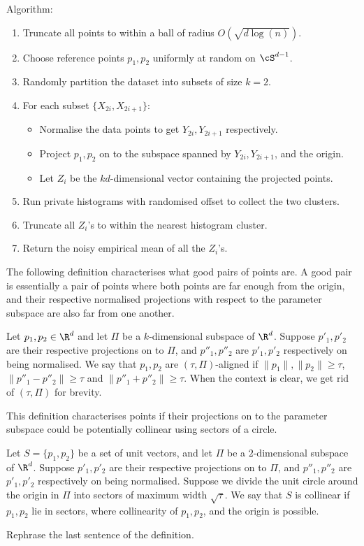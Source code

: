 Algorithm:
\begin{enumerate}
    \item Truncate all points to within a ball of radius
        $O(\sqrt{d\log(n)})$.
    \item Choose reference points $p_1,p_2$ uniformly at
        random on $\cS^{d-1}$.
    \item Randomly partition the dataset into subsets of
        size $k=2$.
    \item For each subset $\{X_{2i},X_{2i+1}\}$:
        \begin{itemize}
            \item Normalise the data points to get
                $Y_{2i},Y_{2i+1}$ respectively.
            \item Project $p_1,p_2$ on to the subspace spanned
                by $Y_{2i},Y_{2i+1}$, and the origin.
            \item Let $Z_i$ be the $kd$-dimensional vector
                containing the projected points.
        \end{itemize}
    \item Run private histograms with randomised offset to collect
        the two clusters.
    \item Truncate all $Z_i$'s to within the nearest histogram
    cluster.
    \item Return the noisy empirical mean of all the $Z_i$'s.
\end{enumerate}

The following definition characterises what good pairs of
points are. A good pair is essentially a pair of points where
both points are far enough from the origin, and their respective
normalised projections with respect to the parameter subspace
are also far from one another.
\begin{definition}
    Let $p_1,p_2 \in \R^d$ and let $\Pi$ be a $k$-dimensional
    subspace of $\R^d$. Suppose $p'_1,p'_2$ are their respective
    projections on to $\Pi$, and $p''_1,p''_2$ are $p'_1,p'_2$
    respectively on being normalised. We say that $p_1,p_2$
    are $(\tau,\Pi)$-aligned if $\|p_1\|,\|p_2\| \geq \tau$,
    $\|p''_1-p''_2\| \geq \tau$ and $\|p''_1+p''_2\| \geq \tau$.
    When the context is clear, we get rid of $(\tau,\Pi)$
    for brevity.
\end{definition}

This definition characterises points if their projections on
to the parameter subspace could be potentially collinear using
sectors of a circle.
\begin{definition}
    Let $S=\{p_1,p_2\}$ be a set of unit vectors, and let $\Pi$
    be a $2$-dimensional subspace of $\R^d$. Suppose $p'_1,p'_2$
    are their respective projections on to $\Pi$, and
    $p''_1,p''_2$ are $p'_1,p'_2$ respectively on being normalised.
    Suppose we divide the unit circle around the origin
    in $\Pi$ into sectors of maximum width $\sqrt{\tau}$.
    We say that $S$ is collinear if $p_1,p_2$ lie in sectors,
    where collinearity of $p_1,p_2$, and the origin is possible.
\end{definition}
Rephrase the last sentence of the definition.

